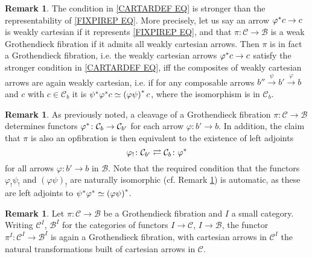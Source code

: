 \documentclass[a4paper,10pt
,draft
]{article}%
\numberwithin{equation}{section}
\numberwithin{figure}{section}
\theoremstyle{definition} %
\newtheorem{remark}[equation]{Remark}%
\newcommand{\1}{\ensuremath{\mathbbm 1}}%
\begin{document}
\begin{remark}\label{COMPSEMI REM}
	The condition in \eqref{CARTARDEF EQ}
	is stronger than the representability of 
	\eqref{FIXPIREP EQ}.
	More precisely, let us say an arrow 
	$\varphi^{\**}c \to c$
	is weakly cartesian if it represents \eqref{FIXPIREP EQ},
	and that  
	$\pi \colon \mathcal{C} \to \mathcal{B}$
	is a weak Grothendieck fibration if it admits all weakly cartesian arrows.
	Then $\pi$ is in fact a Grothendieck fibration,
	i.e. the weakly cartesian arrows 
	$\varphi^{\**}c \to c$
	satisfy the stronger condition in \eqref{CARTARDEF EQ},
	iff the composites of weakly cartesian arrows are again weakly cartesian, 
	i.e. if 
	for any composable arrows
	$b'' \xrightarrow{\psi} b' \xrightarrow{\varphi} b$
	and $c$ with $c \in \mathcal{C}_b$ it is
	$\psi^{\**} \varphi^{\**} c \simeq 
	\left( \varphi \psi \right)^{\**} c$,
	where the isomorphism is in $\mathcal{C}_b$.
\end{remark}



\begin{remark}\label{ALSOOPADJ REM}
	As previously noted, a cleavage of a Grothendieck fibration $\pi \colon \mathcal{C} \to \mathcal{B}$ determines functors 
	$\varphi^{\**} \colon \mathcal{C}_b \to \mathcal{C}_{b'}$
	for each arrow $\varphi \colon b' \to b$.
	In addition, 
	the claim that $\pi$ is also an opfibration is then equivalent to the existence of left adjoints
	\[
	\varphi_! \colon
	\mathcal{C}_{b'}
	\rightleftarrows
	\mathcal{C}_{b}
	\colon \varphi^{\**}
	\]
	for all arrows $\varphi \colon b' \to b$ in $\mathcal{B}$.
	Note that the required condition that the functors
	$\varphi_! \psi_!$ and
	$(\varphi \psi)_!$
	are naturally isomorphic (cf. Remark \ref{COMPSEMI REM})
	is automatic, 
	as these are left adjoints to 
	$\psi^{\**} \varphi^{\**} \simeq 
	\left( \varphi \psi \right)^{\**}$.
\end{remark}


\begin{remark}\label{FUNISGROTH REM}
	Let $\pi \colon \mathcal{C} \to \mathcal{B}$
	be a Grothendieck fibration and
	$I$ a small category.
	Writing $\mathcal{C}^{I}$, $\mathcal{B}^{I}$ for the categories of functors 
	$I \to \mathcal{C}$, $I \to \mathcal{B}$,
	the functor
	$\pi^I \colon \mathcal{C}^I \to \mathcal{B}^I$
	is again a Grothendieck fibration, with cartesian arrows in $\mathcal{C}^I$ the natural transformations built of cartesian arrows in $\mathcal{C}$.
\end{remark}
\end{document}
